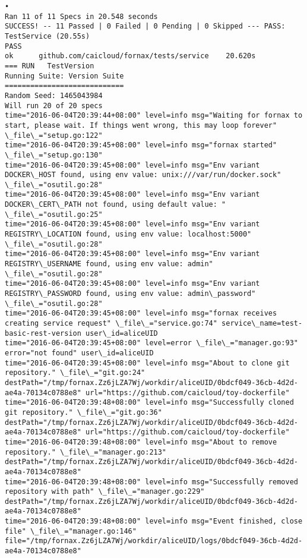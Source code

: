 \begin{lstlisting}[caption={Fornax功能性测试日志}]
•
Ran 11 of 11 Specs in 20.548 seconds
SUCCESS! -- 11 Passed | 0 Failed | 0 Pending | 0 Skipped --- PASS: TestService (20.55s)
PASS
ok  	github.com/caicloud/fornax/tests/service	20.620s
=== RUN   TestVersion
Running Suite: Version Suite
============================
Random Seed: 1465043984
Will run 20 of 20 specs
time="2016-06-04T20:39:44+08:00" level=info msg="Waiting for fornax to start, please wait. If things went wrong, this may loop forever" \_file\_="setup.go:122" 
time="2016-06-04T20:39:45+08:00" level=info msg="fornax started" \_file\_="setup.go:130" 
time="2016-06-04T20:39:45+08:00" level=info msg="Env variant DOCKER\_HOST found, using env value: unix:///var/run/docker.sock" \_file\_="osutil.go:28" 
time="2016-06-04T20:39:45+08:00" level=info msg="Env variant DOCKER\_CERT\_PATH not found, using default value: " \_file\_="osutil.go:25" 
time="2016-06-04T20:39:45+08:00" level=info msg="Env variant REGISTRY\_LOCATION found, using env value: localhost:5000" \_file\_="osutil.go:28" 
time="2016-06-04T20:39:45+08:00" level=info msg="Env variant REGISTRY\_USERNAME found, using env value: admin" \_file\_="osutil.go:28" 
time="2016-06-04T20:39:45+08:00" level=info msg="Env variant REGISTRY\_PASSWORD found, using env value: admin\_password" \_file\_="osutil.go:28" 
time="2016-06-04T20:39:45+08:00" level=info msg="fornax receives creating service request" \_file\_="service.go:74" service\_name=test-basic-rest-version user\_id=aliceUID 
time="2016-06-04T20:39:45+08:00" level=error \_file\_="manager.go:93" error="not found" user\_id=aliceUID 
time="2016-06-04T20:39:45+08:00" level=info msg="About to clone git repository." \_file\_="git.go:24" destPath="/tmp/fornax.Zz6jLZA7Wj/workdir/aliceUID/0bdcf049-36cb-4d2d-ae4a-70134c0788e8" url="https://github.com/caicloud/toy-dockerfile" 
time="2016-06-04T20:39:48+08:00" level=info msg="Successfully cloned git repository." \_file\_="git.go:36" destPath="/tmp/fornax.Zz6jLZA7Wj/workdir/aliceUID/0bdcf049-36cb-4d2d-ae4a-70134c0788e8" url="https://github.com/caicloud/toy-dockerfile" 
time="2016-06-04T20:39:48+08:00" level=info msg="About to remove repository." \_file\_="manager.go:213" destPath="/tmp/fornax.Zz6jLZA7Wj/workdir/aliceUID/0bdcf049-36cb-4d2d-ae4a-70134c0788e8" 
time="2016-06-04T20:39:48+08:00" level=info msg="Successfully removed repository with path" \_file\_="manager.go:229" destPath="/tmp/fornax.Zz6jLZA7Wj/workdir/aliceUID/0bdcf049-36cb-4d2d-ae4a-70134c0788e8" 
time="2016-06-04T20:39:48+08:00" level=info msg="Event finished, close file" \_file\_="manager.go:146" file="/tmp/fornax.Zz6jLZA7Wj/workdir/aliceUID/logs/0bdcf049-36cb-4d2d-ae4a-70134c0788e8" 

\end{lstlisting}
